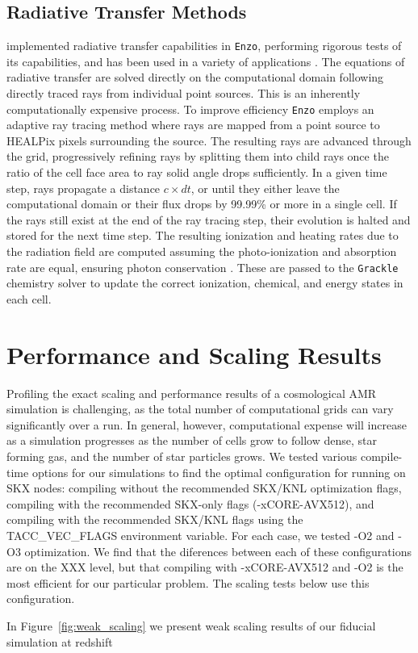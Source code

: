 \documentclass[12pt]{article} %
\begin{document}
\subsection{Radiative Transfer Methods}

\cite{WiseAbel2011} implemented radiative transfer capabilities in \texttt{Enzo}, performing rigorous tests of its capabilities, and has been used in a variety of applications \citep[e.g.][]{Wise2012a,WiseAbel2012,Wise2014, Smith2015, OShea2015, Koh2016, Regan2016a, Regan2016b}. The equations of radiative transfer are solved directly on the computational domain following directly traced rays from individual point sources. This is an inherently computationally expensive process. To improve efficiency \texttt{Enzo} employs an adaptive ray tracing method \citep{AbelWandelt2002} where rays are mapped from a point source to HEALPix pixels surrounding the source. The resulting rays are advanced through the grid, progressively refining rays by splitting them into child rays once the ratio of the cell face area to ray solid angle drops sufficiently. In a given time step, rays propagate a distance $c\times dt$, or until they either leave the computational domain or their flux drops by 99.99\% or more in a single cell. If the rays still exist at the end of the ray tracing step, their evolution is halted and stored for the next time step. The resulting ionization and heating rates due to the radiation field are computed assuming the photo-ionization and absorption rate are equal, ensuring photon conservation \citep{Abel1999, Mellema2006}. These are passed to the \texttt{Grackle} chemistry solver to update the correct ionization, chemical, and energy states in each cell.

\section{Performance and Scaling Results}

Profiling the exact scaling and performance results of a cosmological AMR simulation is challenging, as the total number of computational grids can vary significantly over a run. In general, however, computational expense will increase as a simulation progresses as the number of cells grow to follow dense, star forming gas, and the number of star particles grows. We tested various compile-time options for our simulations to find the optimal configuration for running on SKX nodes: compiling without the recommended SKX/KNL optimization flags, compiling with the recommended SKX-only flags (-xCORE-AVX512), and compiling with the recommended SKX/KNL flags using the TACC\_VEC\_FLAGS environment variable. For each case, we tested -O2 and -O3 optimization. We find that the diferences between each of these configurations are on the XXX level, but that compiling with -xCORE-AVX512 and -O2 is the most efficient for our particular problem. The scaling tests below use this configuration.

In Figure~\ref{fig:weak_scaling} we present weak scaling results of our fiducial simulation at redshift


\def\bibfont{\footnotesize}

\end{document}
